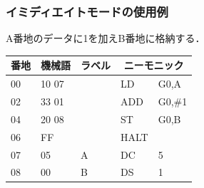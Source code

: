 \documentclass[handout]{beamer}        %
\begin{document}
\begin{frame}
  \frametitle{イミディエイトモードの使用例}
  A番地のデータに1を加えB番地に格納する．
  \vfill
  \begin{minipage}[]{0.58\columnwidth}
  {\small\ttfamily\begin{center}
    \begin{tabular}{|l|l|l|l l|} \hline
      {\footnotesize 番地} & {\footnotesize 機械語} &
      {\footnotesize ラベル} & \multicolumn{2}{|c|}{ニーモニック} \\
      \hline
      00 & 10 07 &   & LD   & G0,A      \\
      02 & 33 01 &   & ADD  & G0,\#1    \\
      04 & 20 08 &   & ST   & G0,B      \\
      06 & FF    &   & HALT &           \\
      07 & 05    & A & DC   & 5         \\
      08 & 00    & B & DS   & 1         \\
      \hline
    \end{tabular}
  \end{center}}
  \end{minipage}
  \begin{minipage}[b]{0.38\columnwidth}
    \vspace{1.3cm}
  \end{minipage}
  \vfill
\end{frame}
\end{document}
